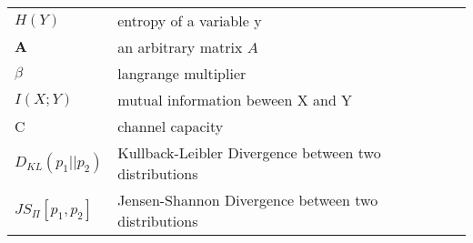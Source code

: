 \begin{longtable}[l]{p{3cm} l}
$H(Y)$ 									&   entropy of a variable y\\
$\textbf{A}$								&   an arbitrary matrix $A$ \\
$\beta$									&  langrange  multiplier\\
$I( X; Y)$									&  mutual information beween X and Y\\
C										&  channel capacity\\
$D_{KL}(p_1||p_2 )$							&  Kullback-Leibler Divergence between two distributions\\
$JS_{\Pi}[p_1, p_2]$							& Jensen-Shannon Divergence between two distributions\\
\end{longtable}

\listoffigures %

	
\clearpage{}
